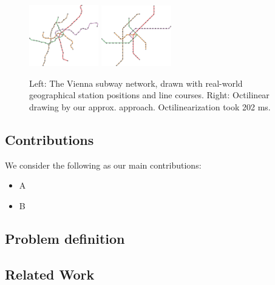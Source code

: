 \documentclass[sigconf]{acmart}
\begin{document}
\begin{figure}
    \centering
	\vspace{-0.6cm}
	\includegraphics[width=0.27\textwidth]{figures/octi_input.pdf}
	\hspace{-1.3cm}
	\includegraphics[width=0.27\textwidth]{figures/octi.pdf}
	\vspace{-.5cm}
	\caption{Left: The Vienna subway network, drawn with real-world geographical station positions and line courses. Right: Octilinear drawing by our approx. approach. Octilinearization took 202 ms.}
	\label{FIG:wien}
	\vspace{-.65cm}
\end{figure}

\subsection{Contributions}
\label{SEC:contrib}
%
We consider the following as our main contributions:
\begin{itemize}[parsep=0.5mm,leftmargin=0mm,itemindent=4mm]
\item A
\item B
\end{itemize}

\subsection{Problem definition}
\label{SEC:def}

\subsection{Related Work}
\label{SEC:related}
\end{document}
